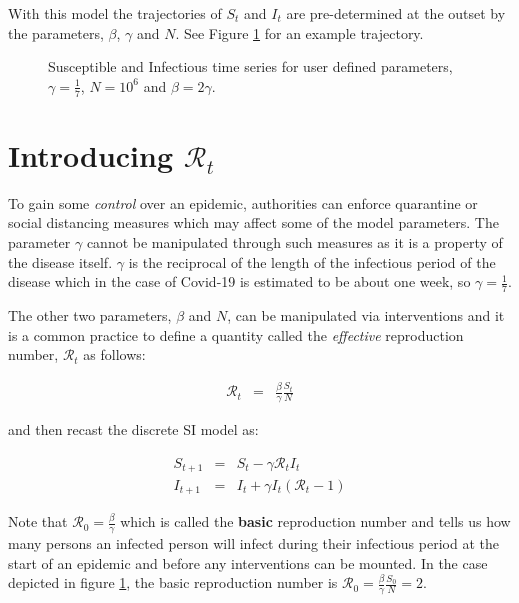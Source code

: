 \documentclass[11pt]{article}
\begin{document}
With this model the trajectories of $S_t$ and $I_t$ are pre-determined at the outset by
the parameters, $\beta$, $\gamma$ and $N$. See Figure \ref{fig1} for an
example trajectory.

\begin{figure}[ht]
\begin{center}
\end{center}
\caption{Susceptible and Infectious time series
for user defined parameters, $\gamma = \frac{1}{7}$, $N=10^6$ and $\beta = 2 \gamma$.
}  
\label{fig1}
\end{figure}

\section{Introducing $\mathcal{R}_t$}

To gain some {\it control} over an epidemic, authorities can enforce quarantine or
social distancing measures which may affect some of the model parameters.
The parameter $\gamma$ cannot be manipulated through such measures as it
is a property of the disease itself.
$\gamma$ is the reciprocal of the length of the infectious period of the disease 
which in the case of Covid-19 is estimated to be about one week, so $\gamma = \frac{1}{7}$.

The other two parameters, $\beta$ and $N$, can be manipulated via interventions
and it is a common practice to define a quantity called the {\it effective} reproduction number, 
$\mathcal{R}_t$ as follows:

\begin{eqnarray}
\mathcal{R}_{t} & = & \frac{\beta}{\gamma}\frac{S_t}{N} \label{eq2} 
\end{eqnarray}

and then recast the discrete SI model as:

\begin{eqnarray}
S_{t+1} & = & S_t - \gamma \mathcal{R}_t  I_t \label{eq3a} \\
I_{t+1} & = & I_t +\gamma  I_t ( \mathcal{R}_t - 1 ) \label{eq3b} 
\end{eqnarray}

Note that $ \mathcal{R}_0 = \frac{\beta}{\gamma} $
which is called the {\bf basic} reproduction number and tells us how many
persons an infected person will infect during their infectious period at the
start of an epidemic and before any interventions can be mounted.
In the case depicted in figure \ref{fig1}, the basic reproduction number is
$\mathcal{R}_0 = \frac{\beta}{\gamma} \frac{S_0}{N} = 2 $.
\end{document}
